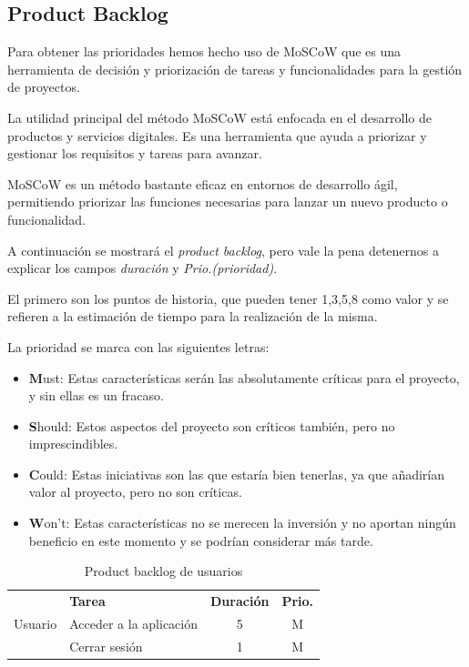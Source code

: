 \subsection{Product Backlog}
Para obtener las prioridades hemos hecho uso de MoSCoW \cite{moscow} que es una herramienta de decisión y priorización de tareas y funcionalidades para la gestión de proyectos.

La utilidad principal del método MoSCoW está enfocada en el desarrollo de productos y servicios digitales. Es una herramienta que ayuda a priorizar y gestionar los requisitos y tareas para avanzar.

MoSCoW es un método bastante eficaz en entornos de desarrollo ágil, permitiendo priorizar las funciones necesarias para lanzar un nuevo producto o funcionalidad.

A continuación se mostrará el \textit{product backlog}, pero vale la pena detenernos a explicar los campos \textit{duración} y \textit{Prio.(prioridad)}.

El primero son los puntos de historia, que pueden tener 1,3,5,8 como valor y se refieren a la estimación de tiempo para la realización de la misma.

La prioridad se marca con las siguientes letras:
\begin{itemize}
	\item  \textbf{M}ust: Estas características serán las absolutamente críticas para el proyecto, y sin ellas es un fracaso.
	\item \textbf{S}hould: Estos aspectos del proyecto son críticos también, pero no imprescindibles.
	\item \textbf{C}ould: Estas iniciativas son las que estaría bien tenerlas, ya que añadirían valor al proyecto, pero no son críticas.
	\item \textbf{W}on't: Estas características no se merecen la inversión y no aportan ningún beneficio en este momento y se podrían considerar más tarde.
\end{itemize}

\begin{table}[H]
	\centering
	\begin{tabular}{|c |p{8cm}|c |c|} \hline 
		\multirow[c]{3}{*}{Usuario}&  \textbf{Tarea}&  \textbf{Duración}& \textbf{Prio.}\\  \cline{2-4}%
		&  Acceder a la aplicación&  5& M\\ \cline{2-4} 
		&  Cerrar sesión&  1& M\\ \hline 
	\end{tabular}
	\caption{Product backlog de usuarios}
	\label{tab:pb_usuarios}
\end{table}

